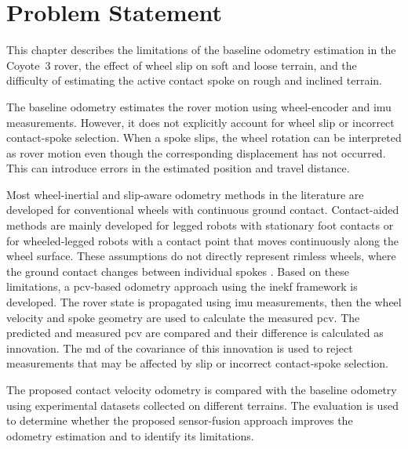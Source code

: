 \documentclass[report.tex]{subfiles}
\begin{document}
\chapter{Problem Statement}
\label{chap:problem_statement}

This chapter describes the limitations of the baseline odometry estimation in the Coyote~3 rover, the effect of wheel slip on soft and loose terrain, and the difficulty of estimating the active contact spoke on rough and inclined terrain.

The baseline odometry estimates the rover motion using wheel-encoder and \gls{imu} measurements. However, it does not explicitly account for wheel slip or incorrect contact-spoke selection. When a spoke slips, the wheel rotation can be interpreted as rover motion even though the corresponding displacement has not occurred. This can introduce errors in the estimated position and travel distance.

Most wheel-inertial and slip-aware odometry methods in the literature are developed for conventional wheels with continuous ground contact. Contact-aided methods are mainly developed for legged robots with stationary foot contacts or for wheeled-legged robots with a contact point that moves continuously along the wheel surface. These assumptions do not directly represent rimless wheels, where the ground contact changes between individual spokes \cite{Hartley2018ContactAidedInEKF,Liu2020,Zhou2025}. Based on these limitations, a \gls{pcv}-based odometry approach using the \gls{inekf} framework is developed. The rover state is propagated using \gls{imu} measurements, then the wheel velocity and spoke geometry are used to calculate the measured \gls{pcv}. The predicted and measured \gls{pcv} are compared and their difference is calculated as innovation. The \gls{md} of the covariance of this innovation is used to reject measurements that may be affected by slip or incorrect contact-spoke selection.

The proposed contact velocity odometry is compared with the baseline odometry using experimental datasets collected on different terrains. The evaluation is used to determine whether the proposed sensor-fusion approach improves the odometry estimation and to identify its limitations.
\end{document}
